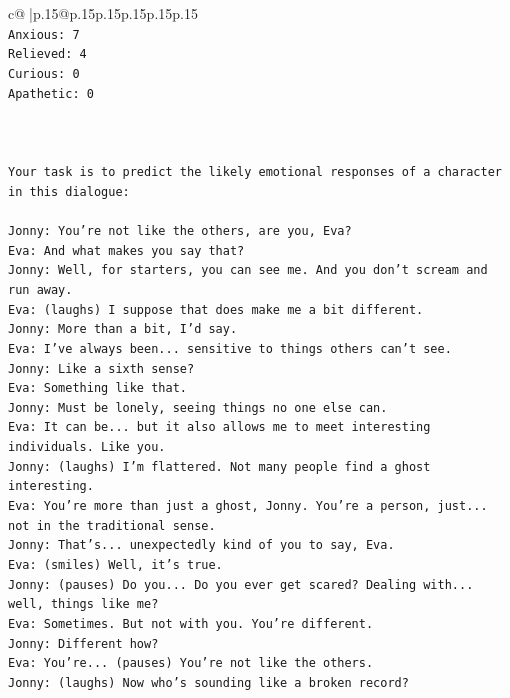 \documentclass{article}
\begin{document}
{\begin{supertabular}{c@{$\;$}|p{.15\linewidth}@{}p{.15\linewidth}p{.15\linewidth}p{.15\linewidth}p{.15\linewidth}p{.15\linewidth}}
{{{\\ 
\texttt{Anxious: 7} \\
\texttt{Relieved: 4} \\
\texttt{Curious: 0} \\
\texttt{Apathetic: 0} \\
\\ 
\\ 
\\ 
\texttt{Your task is to predict the likely emotional responses of a character in this dialogue:} \\
\\ 
\texttt{Jonny: You're not like the others, are you, Eva?} \\
\texttt{Eva: And what makes you say that?} \\
\texttt{Jonny: Well, for starters, you can see me. And you don't scream and run away.} \\
\texttt{Eva: (laughs) I suppose that does make me a bit different.} \\
\texttt{Jonny: More than a bit, I'd say. } \\
\texttt{Eva: I've always been... sensitive to things others can't see. } \\
\texttt{Jonny: Like a sixth sense?} \\
\texttt{Eva: Something like that. } \\
\texttt{Jonny: Must be lonely, seeing things no one else can.} \\
\texttt{Eva: It can be... but it also allows me to meet interesting individuals. Like you.} \\
\texttt{Jonny: (laughs) I'm flattered. Not many people find a ghost interesting.} \\
\texttt{Eva: You're more than just a ghost, Jonny. You're a person, just... not in the traditional sense.} \\
\texttt{Jonny: That's... unexpectedly kind of you to say, Eva.} \\
\texttt{Eva: (smiles) Well, it's true.} \\
\texttt{Jonny: (pauses) Do you... Do you ever get scared? Dealing with... well, things like me?} \\
\texttt{Eva: Sometimes. But not with you. You're different.} \\
\texttt{Jonny: Different how?} \\
\texttt{Eva: You're... (pauses) You're not like the others.} \\
\texttt{Jonny: (laughs) Now who's sounding like a broken record?} \\
}}}
\end{supertabular}}
\end{document}
